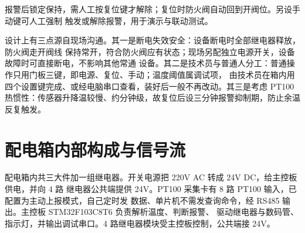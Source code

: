 \documentclass[a4paper,11pt]{ctexart}
\begin{document}
报警后锁定保持，需人工按复位键才解除；复位时防火阀自动回到开阀位。另设手动键可人工强制
触发或解除报警，用于演示与联动测试。

\medskip
设计上有三点源自现场沟通。其一是断电失效安全：设备断电时全部继电器释放，防火阀走开阀线
保持常开，符合防火阀应有状态；现场另配独立电源开关，设备故障时可直接断电，不影响其他常通
设备。其二是技术员与普通人分工：普通操作只用门板三键，即电源、复位、手动；温度阈值属调试项，
由技术员在箱内用四个设置键完成、或经电脑串口查看，装好后一般不再改动。其三是考虑 PT100
热惯性：传感器升降温较慢、约分钟级，故复位后设三分钟报警抑制期，防止余温反复触发。

\section{配电箱内部构成与信号流}
配电箱内共三大件加一组继电器。开关电源把 220V AC 转成 24V DC，给主控板供电，并向 4 路
继电器公共端提供 24V。PT100 采集卡有 8 路 PT100 输入，已配置为主动上报模式，自己定时发
数据、单片机不需发查询命令，经 RS485 输出。主控板 STM32F103C8T6 负责解析温度、判断报警、
驱动继电器与数码管、指示灯，并输出调试串口。4 路继电器模块受主控板控制，公共端接 24V。
\end{document}
